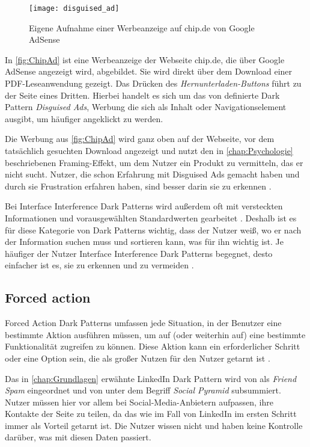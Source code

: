 \documentclass[conference,compsoc,final,a4paper]{IEEEtran}
\begin{document}
\begin{figure}[!ht]
  \centering
  \texttt{[image: disguised\_ad]}
  \caption{Eigene Aufnahme einer Werbeanzeige auf chip.de von Google AdSense~\autocite{ChipAd}}
  \label{fig:ChipAd}
\end{figure}

In \autoref{fig:ChipAd} ist eine Werbeanzeige der Webseite chip.de, die über Google AdSense angezeigt wird, abgebildet. Sie wird direkt über dem Download einer PDF-Leseanwendung gezeigt. Das Drücken des \textit{Hernunterladen-Buttons} führt zu der Seite eines Dritten. Hierbei handelt es sich um das von \citeauthor{Brignull} \autocite{Brignull} definierte Dark Pattern \textit{Disguised Ads}, Werbung die sich als Inhalt oder Navigationselement ausgibt, um häufiger angeklickt zu werden.

Die Werbung aus \autoref{fig:ChipAd} wird ganz oben auf der Webseite, vor dem tatsächlich gesuchten Download angezeigt und nutzt den in \autoref{chap:Psychologie} beschriebenen Framing-Effekt, um dem Nutzer ein Produkt zu vermitteln, das er nicht sucht. Nutzer, die schon Erfahrung mit Disguised Ads gemacht haben und durch sie Frustration erfahren haben, sind besser darin sie zu erkennen \autocite{M.Bhoot2020}.

Bei Interface Interference Dark Patterns wird außerdem oft mit versteckten Informationen und vorausgewählten Standardwerten gearbeitet \autocite{Gray_2018}. Deshalb ist es für diese Kategorie von Dark Patterns wichtig, dass der Nutzer weiß, wo er nach der Information suchen muss und sortieren kann, was für ihn wichtig ist. Je häufiger der Nutzer Interface Interference Dark Patterns begegnet, desto einfacher ist es, sie zu erkennen und zu vermeiden \autocite{M.Bhoot2020}.

\subsection{Forced action}
Forced Action Dark Patterns umfassen jede Situation, in der Benutzer eine bestimmte Aktion ausführen müssen, um auf (oder weiterhin auf) eine bestimmte Funktionalität zugreifen zu können. Diese Aktion kann ein erforderlicher Schritt oder eine Option sein, die als großer Nutzen für den Nutzer getarnt ist \autocite{Gray_2018}.

Das in \autoref{chap:Grundlagen} erwähnte LinkedIn Dark Pattern wird von \citeauthor{Brignull} \autocite{Brignull} als \textit{Friend Spam} eingeordnet und von \citeauthor*{Gray_2018} \autocite{Gray_2018} unter dem Begriff \textit{Social Pyramid} subsummiert. Nutzer müssen hier vor allem bei Social-Media-Anbietern aufpassen, ihre Kontakte der Seite zu teilen, da das wie im Fall von LinkedIn im ersten Schritt immer als Vorteil getarnt ist. Die Nutzer wissen nicht und haben keine Kontrolle darüber, was mit diesen Daten passiert.
\end{document}
